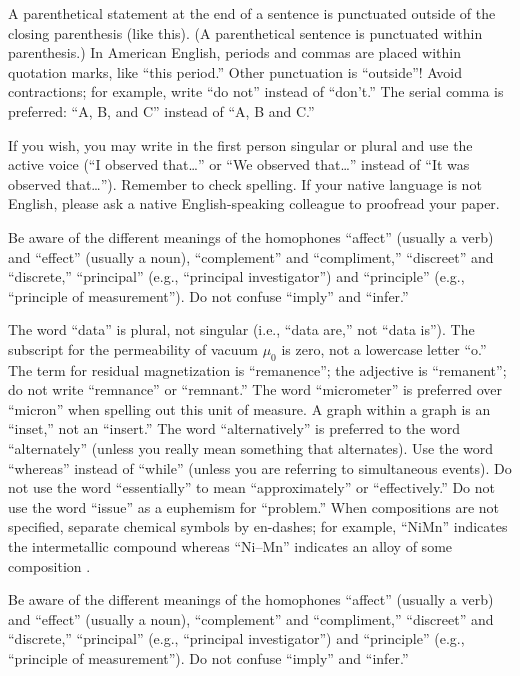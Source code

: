 \documentclass[conf]{new-aiaa}
\begin{document}
    A parenthetical statement at the end of a sentence is punctuated outside of the closing parenthesis (like this). (A parenthetical sentence is punctuated within parenthesis.) In American English, periods and commas are placed within quotation marks, like ``this period.'' Other punctuation is ``outside''! Avoid contractions; for example, write ``do not'' instead of ``don’t.'' The serial comma is preferred: ``A, B, and C'' instead of ``A, B and C.''
    
    If you wish, you may write in the first person singular or plural and use the active voice (``I observed that\ldots'' or ``We observed that\ldots'' instead of ``It was observed that\ldots''). Remember to check spelling. If your native language is not English, please ask a native English-speaking colleague to proofread your paper.
    
    Be aware of the different meanings of the homophones ``affect'' (usually a verb) and ``effect'' (usually a noun), ``complement'' and ``compliment,'' ``discreet'' and ``discrete,'' ``principal'' (e.g., ``principal investigator'') and ``principle'' (e.g., ``principle of measurement''). Do not confuse ``imply'' and ``infer.''
    
    The word ``data'' is plural, not singular (i.e., ``data are,'' not ``data is''). The subscript for the permeability of vacuum $\mu_0$ is zero, not a lowercase letter ``o.'' The term for residual magnetization is ``remanence''; the adjective is ``remanent''; do not write ``remnance'' or ``remnant.'' The word ``micrometer'' is preferred over ``micron'' when spelling out this unit of measure. A graph within a graph is an ``inset,'' not an ``insert.'' The word ``alternatively'' is preferred to the word ``alternately'' (unless you really mean something that alternates). Use the word ``whereas'' instead of ``while'' (unless you are referring to simultaneous events). Do not use the word ``essentially'' to mean ``approximately'' or ``effectively.'' Do not use the word ``issue'' as a euphemism for ``problem.'' When compositions are not specified, separate chemical symbols by en-dashes; for example, ``NiMn'' indicates the intermetallic compound  whereas ``Ni--Mn'' indicates an alloy of some composition .
    
    Be aware of the different meanings of the homophones ``affect'' (usually a verb) and ``effect'' (usually a noun), ``complement'' and ``compliment,'' ``discreet'' and ``discrete,'' ``principal'' (e.g., ``principal investigator'') and ``principle'' (e.g., ``principle of measurement''). Do not confuse ``imply'' and ``infer.''
    
\end{document}
